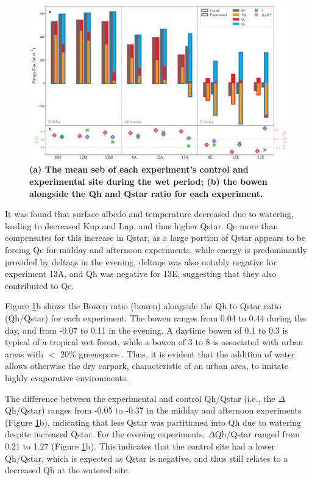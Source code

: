 \documentclass[final,3p,times,authoryear]{elsarticle}
\begin{document}
\begin{figure}
\centering
\includegraphics[trim={0 0 0 0},clip,scale=1.0]{pict017.png}
\caption{\bf (a) The mean \gls{seb} of each experiment's control and experimental site during the wet period; (b) the \gls{bowen} alongside the \gls{Qh} and \gls{Qstar} ratio for each experiment.}
 \label{fig:3.6}
\end{figure}

It was found that surface albedo and temperature decreased due to watering, leading to decreased \gls{Kup} and \gls{Lup}, and thus higher \gls{Qstar}. \gls{Qe} more than compensates for this increase in \gls{Qstar}, as a large portion of \gls{Qstar} appears to be forcing \gls{Qe} for midday and afternoon experiments, while energy is predominantly provided by \gls{deltaqs} in the evening. \gls{deltaqs} was also notably negative for experiment 13A, and \gls{Qh} was negative for 13E, suggesting that they also contributed to \gls{Qe}.

Figure \ref{fig:3.6}b shows the Bowen ratio (\gls{bowen}) alongside the \gls{Qh} to \gls{Qstar} ratio (\gls{Qh}/\gls{Qstar}) for each experiment. The \gls{bowen} ranges from 0.04 to 0.44 during the day, and from -0.07 to 0.11 in the evening. A daytime \gls{bowen} of 0.1 to 0.3 is typical of a tropical wet forest, while a \gls{bowen} of 3 to 8 is associated with urban areas with $<$ 20\% greenspace \citep{Oke2017}. Thus, it is evident that the addition of water allows otherwise the dry carpark, characteristic of an urban area, to imitate highly evaporative environments.

The difference between the experimental and control \gls{Qh}/\gls{Qstar} (i.e., the $\Delta$\gls{Qh}/\gls{Qstar}) ranges from -0.05 to -0.37 in the midday and afternoon experiments (Figure \ref{fig:3.6}b), indicating that less \gls{Qstar} was partitioned into \gls{Qh} due to watering despite increased \gls{Qstar}. For the evening experiments, $\Delta$\gls{Qh}/\gls{Qstar} ranged from 0.21 to 1.27 (Figure \ref{fig:3.6}b). This indicates that the control site had a lower \gls{Qh}/\gls{Qstar}, which is expected as \gls{Qstar} is negative, and thus still relates to a decreased \gls{Qh} at the watered site.
\end{document}
